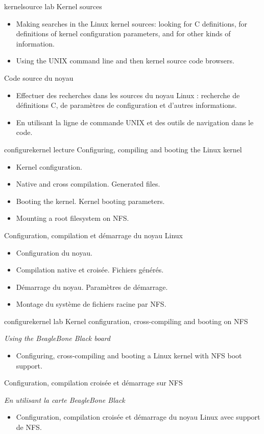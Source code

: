 {kernelsource}
{lab}
{Kernel sources}
{
  \begin{itemize}
  \item Making searches in the Linux kernel sources: looking for C
    definitions, for definitions of kernel configuration parameters,
    and for other kinds of information.
  \item Using the UNIX command line and then kernel source code
    browsers.
 \end{itemize}
}
{Code source du noyau}
{
  \begin{itemize}
  \item Effectuer des recherches dans les sources du noyau Linux :
    recherche de définitions C, de paramètres de configuration et d'autres
    informations.
  \item En utilisant la ligne de commande UNIX et des outils de
    navigation dans le code.
 \end{itemize}
}
{configurekernel}
{lecture}
{Configuring, compiling and booting the Linux kernel}
{
  \begin{itemize}
  \item Kernel configuration.
  \item Native and cross compilation. Generated files.
  \item Booting the kernel. Kernel booting parameters.
  \item Mounting a root filesystem on NFS.
  \end{itemize}
}
{Configuration, compilation et démarrage du noyau Linux}
{
  \begin{itemize}
  \item Configuration du noyau.
  \item Compilation native et croisée. Fichiers générés.
  \item Démarrage du noyau. Paramètres de démarrage.
  \item Montage du système de fichiers racine par NFS.
  \end{itemize}
}
{configurekernel}
{lab}
{Kernel configuration, cross-compiling and booting on NFS}
{
  {\em Using the BeagleBone Black board}
  \begin{itemize}
  \item Configuring, cross-compiling and booting a Linux kernel with
    NFS boot support.
  \end{itemize}
}
{Configuration, compilation croisée et démarrage sur NFS}
{
  {\em En utilisant la carte BeagleBone Black}
  \begin{itemize}
  \item Configuration, compilation croisée et démarrage du noyau Linux
    avec support de NFS.
  \end{itemize}
}
